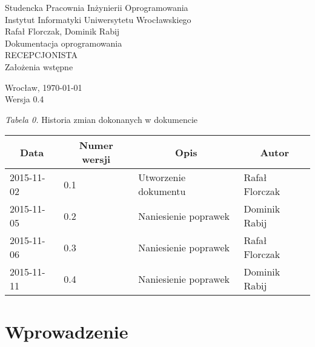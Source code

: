 \documentclass [11pt, a4paper, leqno] {article}
\begin{document}

\begin{center}
  \thispagestyle{empty} %
  {\large Studencka Pracownia Inżynierii Oprogramowania} \\ [0.5cm]
	{\large Instytut Informatyki Uniwersytetu Wrocławskiego} \\ [6.0cm]

  {\large Rafał Florczak, Dominik Rabij} \\ [1.5cm]

	{\huge Dokumentacja oprogramowania} \\ [0.5cm]
  {\huge RECEPCJONISTA} \\ [1.5cm]

  {\large Założenia wstępne} \\ [0.5cm]

  \vfill
  
  {\large Wrocław, \today} \\ [0.5cm]
  {\large Wersja 0.4}
\end{center}

\newpage


\textit{Tabela 0.} Historia zmian dokonanych w dokumencie

\begin{center}
  \begin{tabular}{| l | l | l | l |}
    \hline
    \multicolumn{1}{|c|}{Data} & 
    \multicolumn{1}{|c|}{Numer wersji} &  
    \multicolumn{1}{|c|}{Opis} &
    \multicolumn{1}{|c|}{Autor} \\ \hline \hline
    2015-11-02 & 0.1 & Utworzenie dokumentu & Rafał Florczak \\ \hline
    2015-11-05 & 0.2 & Naniesienie poprawek & Dominik Rabij\\ \hline
    2015-11-06 & 0.3 & Naniesienie poprawek & Rafał Florczak\\ \hline
    2015-11-11 & 0.4 & Naniesienie poprawek & Dominik Rabij\\ \hline
  \end{tabular}
\end{center}

\medskip

\tableofcontents

\newpage

\section{Wprowadzenie}
\end{document}
